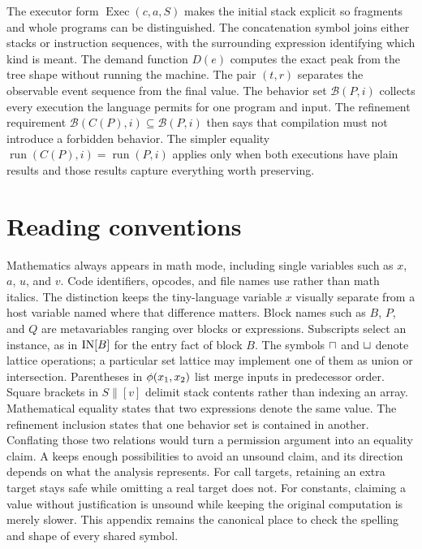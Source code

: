 The executor form $\operatorname{Exec}(c,a,S)$ makes the initial stack explicit so fragments and whole programs can be distinguished.
The concatenation symbol joins either stacks or instruction sequences, with the surrounding expression identifying which kind is meant.
The demand function $D(e)$ computes the exact peak from the tree shape without running the machine.
The pair $(t,r)$ separates the observable event sequence from the final value.
The behavior set $\mathcal{B}(P,i)$ collects every execution the language permits for one program and input.
The refinement requirement $\mathcal{B}(C(P),i)\subseteq\mathcal{B}(P,i)$ then says that compilation must not introduce a forbidden behavior.
The simpler equality $\operatorname{run}(C(P),i)=\operatorname{run}(P,i)$ applies only when both executions have plain results and those results capture everything worth preserving.

\section{Reading conventions}
\label{sec:app-c-conventions}

Mathematics always appears in math mode, including single variables such as $x$, $a$, $u$, and $v$.
Code identifiers, opcodes, and file names use  rather than math italics.
The distinction keeps the tiny-language variable $x$ visually separate from a host variable named  where that difference matters.
Block names such as $B$, $P$, and $Q$ are metavariables ranging over blocks or expressions.
Subscripts select an instance, as in $\mathrm{IN}[B]$ for the entry fact of block $B$.
The symbols $\sqcap$ and $\sqcup$ denote lattice operations; a particular set lattice may implement one of them as union or intersection.
Parentheses in $\phi(x_1,x_2)$ list merge inputs in predecessor order.
Square brackets in $S\mathbin{\|}[v]$ delimit stack contents rather than indexing an array.
Mathematical equality states that two expressions denote the same value.
The refinement inclusion states that one behavior set is contained in another.
Conflating those two relations would turn a permission argument into an equality claim.
A  keeps enough possibilities to avoid an unsound claim, and its direction depends on what the analysis represents.
For call targets, retaining an extra target stays safe while omitting a real target does not.
For constants, claiming a value without justification is unsound while keeping the original computation is merely slower.
This appendix remains the canonical place to check the spelling and shape of every shared symbol.
